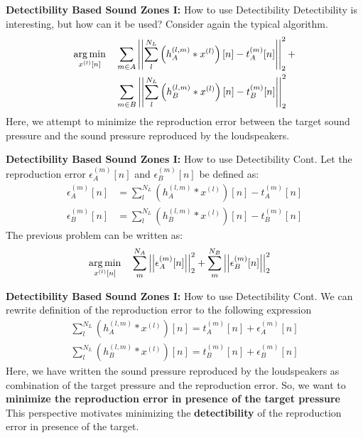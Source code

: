 \documentclass[aspectratio=169]{beamer}
\begin{document}
\begin{frame}{\textbf{Detectibility Based Sound Zones I:} How to use Detectibility} 
    Detectibility is interesting, but how can it be used? Consider again the typical algorithm. 
    \begin{align*}
        \argmin{x^{(l)}[n]}{
            & \sum_{m\in A} \norm[2][2]{\sum_l^{N_L} \left(h_A^{(l,m)} \ast x^{(l)}\right)[n] - t_A^{(m)}[n]} + \\
            & \sum_{m\in B} \norm[2][2]{\sum_l^{N_L} \left(h_B^{(l,m)} \ast x^{(l)}\right)[n] - t_B^{(m)}[n] } 
        }
    \end{align*}
    Here, we attempt to minimize the reproduction error between the target sound pressure and the sound pressure reproduced by the loudspeakers. 
\end{frame}

\begin{frame}{\textbf{Detectibility Based Sound Zones I:} How to use Detectibility Cont.} 
    Let the reproduction error $\epsilon_A^{(m)}[n]$ and $\epsilon_B^{(m)}[n]$ be defined as: 
    \begin{align*}
        \epsilon_A^{(m)}[n] &= \sum_l^{N_L} \left(h_A^{(l,m)} \ast x^{(l)}\right)[n] - t_A^{(m)}[n] \\
        \epsilon_B^{(m)}[n] &= \sum_l^{N_L} \left(h_B^{(l,m)} \ast x^{(l)}\right)[n] - t_B^{(m)}[n]
    \end{align*}
    The previous problem can be written as: 
    \begin{align*}
        \argmin{x^{(l)}[n]}{
            & \sum_m^{N_A} \norm[2][2]{\epsilon_A^{(m)}[n]} + 
            \sum_m^{N_B} \norm[2][2]{\epsilon_B^{(m)}[n]} 
        }
    \end{align*}
\end{frame}

\begin{frame}{\textbf{Detectibility Based Sound Zones I:} How to use Detectibility Cont.} 
    We can rewrite definition of the reproduction error to the following expression
    \begin{align*}
        \sum_l^{N_L} \left(h_A^{(l,m)} \ast x^{(l)}\right)[n] = t_A^{(m)}[n] + \epsilon_A^{(m)}[n] \\
        \sum_l^{N_L} \left(h_B^{(l,m)} \ast x^{(l)}\right)[n] = t_B^{(m)}[n] + \epsilon_B^{(m)}[n] 
    \end{align*}
    Here, we have written the sound pressure reproduced by the loudspeakers as combination of the target pressure and the reproduction error.
    So, we want to \textbf{minimize the reproduction error in presence of the target pressure}\\ 
    \vspace{10pt}
    This perspective motivates minimizing the \textbf{detectibility} of the reproduction error in presence of the target. 
\end{frame}
\end{document}
